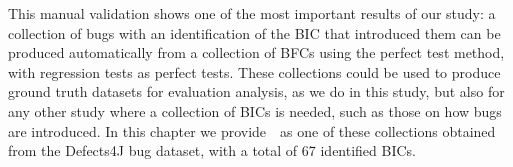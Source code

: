 
This manual validation shows one of the most important results of our study: a collection of bugs with an identification of the BIC that introduced them can be produced automatically from a collection of BFCs using the perfect test method, with regression tests as perfect tests. 
These collections could be used to produce ground truth datasets for evaluation analysis, as we do in this study, but also for any other study where a collection of BICs is needed, such as those on how bugs are introduced.
In this chapter we provide~\datasetName~as one of these collections obtained from the Defects4J bug dataset, with a total of 67 identified BICs.

